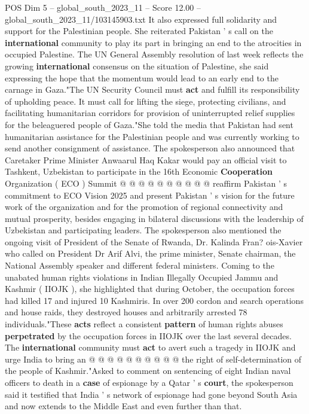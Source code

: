 \begin{textsample}{POS Dim 5 – global\_south\_2023\_11 – Score 12.00 – global\_south\_2023\_11/103145903.txt}
It also expressed full solidarity and support for the Palestinian people.
She reiterated Pakistan ' s call on the \textbf{international} community to play its part in bringing an end to the atrocities in occupied Palestine.
The UN General Assembly resolution of last week reflects the growing \textbf{international} consensus on the situation of Palestine, she said expressing the hope that the momentum would lead to an early end to the carnage in Gaza."The UN Security Council must \textbf{act} and fulfill its responsibility of upholding peace.
It must call for lifting the siege, protecting civilians, and facilitating humanitarian corridors for provision of uninterrupted relief supplies for the beleaguered people of Gaza."She told the media that Pakistan had sent humanitarian assistance for the Palestinian people and was currently working to send another consignment of assistance.
The spokesperson also announced that Caretaker Prime Minister Anwaarul Haq Kakar would pay an official visit to Tashkent, Uzbekistan to participate in the 16th Economic \textbf{Cooperation} Organization ( ECO ) Summit @ @ @ @ @ @ @ @ @ @ reaffirm Pakistan ' s commitment to ECO Vision 2025 and present Pakistan ' s vision for the future work of the organization and for the promotion of regional connectivity and mutual prosperity, besides engaging in bilateral discussions with the leadership of Uzbekistan and participating leaders.
The spokesperson also mentioned the ongoing visit of President of the Senate of Rwanda, Dr.
Kalinda Fran? ois-Xavier who called on President Dr Arif Alvi, the prime minister, Senate chairman, the National Assembly speaker and different federal ministers.
Coming to the unabated human rights violations in Indian Illegally Occupied Jammu and Kashmir ( IIOJK ), she highlighted that during October, the occupation forces had killed 17 and injured 10 Kashmiris.
In over 200 cordon and search operations and house raids, they destroyed houses and arbitrarily arrested 78 individuals."These \textbf{acts} reflect a consistent \textbf{pattern} of human rights abuses \textbf{perpetrated} by the occupation forces in IIOJK over the last several decades.
The \textbf{international} community must \textbf{act} to avert such a tragedy in IIOJK and urge India to bring an @ @ @ @ @ @ @ @ @ @ the right of self-determination of the people of Kashmir."Asked to comment on sentencing of eight Indian naval officers to death in a \textbf{case} of espionage by a Qatar ' s \textbf{court}, the spokesperson said it testified that India ' s network of espionage had gone beyond South Asia and now extends to the Middle East and even further than that.

\end{textsample}
